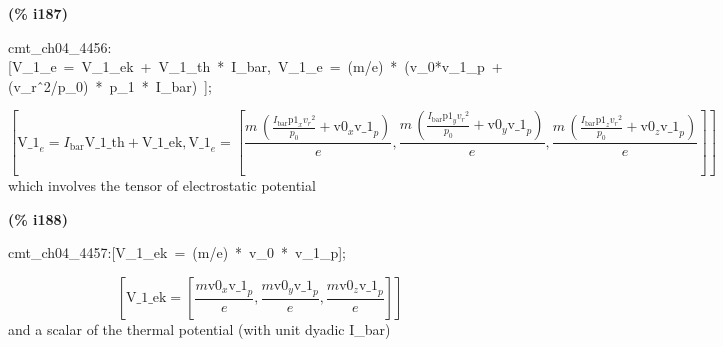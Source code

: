 \documentclass[fleqn]{article}
\begin{document}
\noindent
\begin{minipage}[t]{4.000000em}\color{red}\bfseries
(\% i187)	
\end{minipage}
\begin{minipage}[t]{\textwidth}\color{blue}
cmt\_ch04\_4456:[V\_1\_e\ =\ V\_1\_ek\ +\ V\_1\_th\ *\ I\_bar,\ V\_1\_e\ =\ (m/e)\ *\ (v\_0*v\_1\_p\ +\ (v\_r\^\ 2/p\_0)\ *\ p\_1\ *\ I\_bar)\ ];
\end{minipage}
\[\displaystyle \tag{\% o187} 
\operatorname{[}{{\ensuremath{\mathrm{V\_ 1}}}_e}={I_{\ensuremath{\mathrm{bar}}}} \ensuremath{\mathrm{V\_ 1\_ th}}+\ensuremath{\mathrm{V\_ 1\_ ek}}\operatorname{,}{{\ensuremath{\mathrm{V\_ 1}}}_e}=
\left[ \frac{m\, \left( \frac{{I_{\ensuremath{\mathrm{bar}}}} {{\ensuremath{\mathrm{p1}}}_x} {{{v_r}}^{2}}}{{p_0}}+{{\ensuremath{\mathrm{v0}}}_x} {{\ensuremath{\mathrm{v\_ 1}}}_p}\right) }{e}\operatorname{,}\frac{m\, \left( \frac{{I_{\ensuremath{\mathrm{bar}}}} {{\ensuremath{\mathrm{p1}}}_y} {{{v_r}}^{2}}}{{p_0}}+{{\ensuremath{\mathrm{v0}}}_y} {{\ensuremath{\mathrm{v\_ 1}}}_p}\right) }{e}\operatorname{,}\frac{m\, \left( \frac{{I_{\ensuremath{\mathrm{bar}}}} {{\ensuremath{\mathrm{p1}}}_z} {{{v_r}}^{2}}}{{p_0}}+{{\ensuremath{\mathrm{v0}}}_z} {{\ensuremath{\mathrm{v\_ 1}}}_p}\right) }{e}\right] \operatorname{]}\mbox{}
\]
which involves the tensor of electrostatic potential


\noindent
\begin{minipage}[t]{4.000000em}\color{red}\bfseries
(\% i188)	
\end{minipage}
\begin{minipage}[t]{\textwidth}\color{blue}
cmt\_ch04\_4457:[V\_1\_ek\ =\ (m/e)\ *\ v\_0\ *\ v\_1\_p];
\end{minipage}
\[\displaystyle \tag{\% o188} 
\left[ \ensuremath{\mathrm{V\_ 1\_ ek}}=\left[ \frac{m {{\ensuremath{\mathrm{v0}}}_x} {{\ensuremath{\mathrm{v\_ 1}}}_p}}{e}\operatorname{,}\frac{m {{\ensuremath{\mathrm{v0}}}_y} {{\ensuremath{\mathrm{v\_ 1}}}_p}}{e}\operatorname{,}\frac{m {{\ensuremath{\mathrm{v0}}}_z} {{\ensuremath{\mathrm{v\_ 1}}}_p}}{e}\right] \right] \mbox{}
\]
and a scalar of the thermal potential (with unit dyadic I\_bar)
\end{document}
